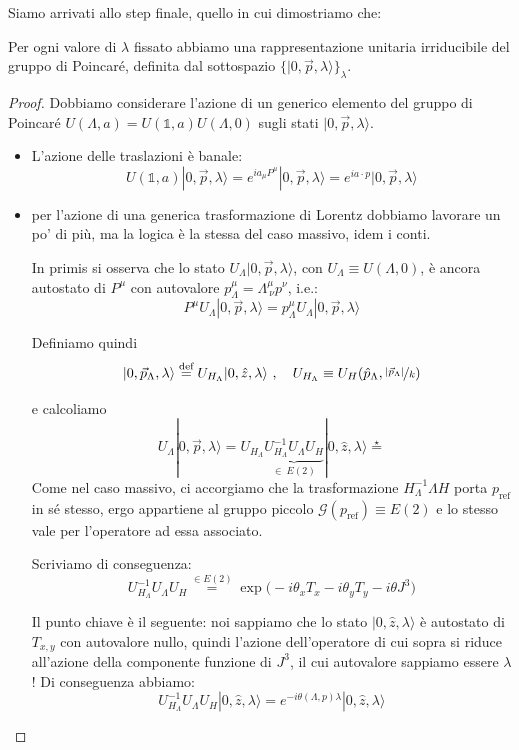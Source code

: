 \documentclass[../main.tex]{subfiles}
\begin{document}
Siamo arrivati allo step finale, quello in cui dimostriamo che:
\begin{kaobox}
    Per ogni valore di \(\lambda\) fissato abbiamo una rappresentazione unitaria irriducibile del gruppo di Poincaré, definita dal sottospazio \({\big\{ |0, \Vec{p}, \lambda\rangle \big\}_\lambda}\).
\end{kaobox}
\begin{proof}
    Dobbiamo considerare l'azione di un generico elemento del gruppo di Poincaré \(U(\Lambda, a) = U(\mathbb 1, a)U(\Lambda, 0)\) sugli stati $|0, \Vec{p}, \lambda\rangle$.
    \begin{itemize}
        \item L'azione delle traslazioni è banale:
        \[
        \boxed{U(\mathbb 1, a)|0, \Vec{p}, \lambda\rangle = e^{ia_\mu P^\mu}|0, \Vec{p}, \lambda\rangle = e^{ia\cdot p}|0, \Vec{p}, \lambda\rangle}
        \]
        
        \item per l'azione di una generica trasformazione di Lorentz dobbiamo lavorare un po' di più, ma la logica è la stessa del caso massivo, idem i conti. 

        In primis si osserva che lo stato $U_\Lambda|0, \Vec{p}, \lambda\rangle$, con $U_\Lambda\equiv U(\Lambda, 0)$, è ancora autostato di $P^\mu$ con autovalore \(p_\Lambda^\mu = \Lambda^\mu_{~\nu}p^\nu\), i.e.:
        \[
        P^\mu U_\Lambda|0, \Vec{p}, \lambda\rangle = p_\Lambda^\mu U_\Lambda|0, \Vec{p}, \lambda\rangle
        \]

        Definiamo quindi 
        \[|0, \Vec{p}_\Lambda, \lambda\rangle \overset{\text{def}}{=} U_{H_\Lambda}|0, \hat{z}, \lambda\rangle~, \quad U_{H_\Lambda} \equiv U_{H}(\hat{p}_\Lambda, \nicefrac{|\Vec{p}_\Lambda|}{k})\]

        e calcoliamo 
        \[
        U_\Lambda|0, \Vec{p}, \lambda\rangle = U_{H_\Lambda} \underbrace{U_{H_\Lambda}^{-1}U_\Lambda U_H}_{\in~ E(2)} |0, \hat{z}, \lambda\rangle  \overset{\star}{=}
        \]
        Come nel caso massivo, ci accorgiamo che la trasformazione \(H_\Lambda^{-1}\Lambda H\) porta $p_\text{ref}$ in sé stesso, ergo appartiene al gruppo piccolo $\mathscr G(p_\text{ref})\equiv E(2)$ e lo stesso vale per l'operatore ad essa associato.

        Scriviamo di conseguenza:
        \[
        U_{H_\Lambda}^{-1}U_\Lambda U_H \overset{\in E(2)}{=}\exp\big(-i\theta_xT_x-i\theta_yT_y-i\theta J^3\big)
        \]

        Il punto chiave è il seguente: noi sappiamo che lo stato \(|0, \hat{z}, \lambda\rangle\) è autostato di $T_{x,y}$ con autovalore nullo, quindi l'azione dell'operatore di cui sopra si riduce all'azione della componente funzione di $J^3$, il cui autovalore sappiamo essere $\lambda$! Di conseguenza abbiamo:
        \[
        U_{H_\Lambda}^{-1}U_\Lambda U_H|0, \hat{z}, \lambda\rangle = e^{-i\theta(\Lambda, p)\lambda}|0, \hat{z}, \lambda\rangle
        \]


\end{itemize}
\end{proof}
\end{document}
